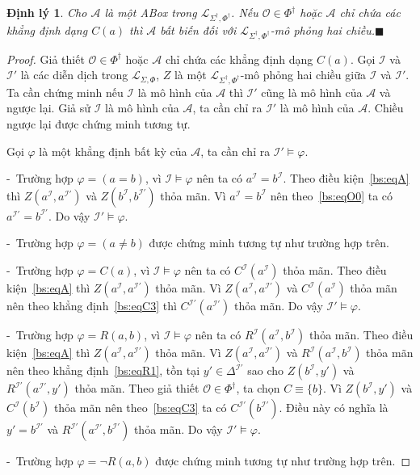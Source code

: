 \documentclass[12pt,a4paper,twoside]{report}
\newcommand{\mL}		{\mathcal{L}}
\newcommand{\mA}		{\mathcal{A}}
\newcommand{\mI}		{\mathcal{I}}
\newcommand{\mO}		{\mathcal{O}}
\newcommand{\PhiDag}	{\Phi^\dag}
\newcommand{\mLSP}		{\mL_{\Sigma,\Phi}}
\newcommand{\mLSPD}		{\mL_{\Sigma^\dag,\Phi^\dag}}
\newcommand{\semiItem}	{\mbox{- }}
\newcommand{\myend}		{\mbox{}\hfill\mbox{{\scriptsize$\!\blacksquare$}}}
\newtheorem{Theorem}{Định lý}[chapter]
\theoremstyle{definition}
\begin{document}
\begin{Theorem}
Cho $\mA$ là một ABox trong $\mLSPD$. Nếu $\mO \in \PhiDag$ hoặc $\mA$ chỉ chứa các khẳng định dạng $C(a)$ thì $\mA$ bất biến đối với $\mLSPD$-mô phỏng hai chiều.\myend
\end{Theorem}

\begin{proof}
Giả thiết $\mO \in \PhiDag$ hoặc $\mA$ chỉ chứa các khẳng định dạng $C(a)$. Gọi $\mI$ và $\mI'$ là các diễn dịch trong $\mLSP$, $Z$ là một $\mLSPD$-mô phỏng hai chiều giữa $\mI$ và $\mI'$. Ta cần chứng minh nếu $\mI$ là mô hình của $\mA$ thì $\mI'$ cũng là mô hình của $\mA$ và ngược lại. Giả sử $\mI$ là mô hình của $\mA$, ta cần chỉ ra $\mI'$ là mô hình của $\mA$. Chiều ngược lại được chứng minh tương tự.

Gọi $\varphi$ là một khẳng định bất kỳ của $\mA$, ta cần chỉ ra $\mI' \models \varphi$.

\semiItem Trường hợp $\varphi = (a=b)$, vì $\mI \models \varphi$ nên ta có $a^\mI = b^\mI$. Theo điều kiện~\eqref{bs:eqA} thì $Z(a^\mI, a^{\mI'})$ và $Z(b^\mI, b^{\mI'})$ thỏa mãn. Vì $a^\mI = b^\mI$ nên theo~\eqref{bs:eqO0} ta có $a^{\mI'} = b^{\mI'}$. Do vậy $\mI' \models \varphi$.

\semiItem Trường hợp $\varphi = (a\not=b)$ được chứng minh tương tự như trường hợp trên.

\semiItem Trường hợp $\varphi = C(a)$, vì $\mI \models \varphi$ nên ta có $C^\mI(a^\mI)$ thỏa mãn. Theo điều kiện~\eqref{bs:eqA} thì $Z(a^\mI, a^{\mI'})$ thỏa mãn. Vì $Z(a^\mI, a^{\mI'})$ và $C^\mI(a^\mI)$ thỏa mãn nên theo khẳng định~\eqref{bs:eqC3} thì $C^{\mI'}(a^{\mI'})$ thỏa mãn. Do vậy $\mI' \models \varphi$.

\semiItem Trường hợp $\varphi = R(a,b)$, vì $\mI \models \varphi$ nên ta có $R^\mI(a^\mI, b^\mI)$ thỏa mãn. Theo điều kiện~\eqref{bs:eqA} thì $Z(a^\mI, a^{\mI'})$ thỏa mãn. Vì $Z(a^\mI, a^{\mI'})$ và $R^{\mI}(a^\mI, b^\mI)$ thỏa mãn nên theo khẳng định~\eqref{bs:eqR1}, tồn tại $y' \in \Delta^{\mI'}$ sao cho $Z(b^\mI, y')$ và $R^{\mI'}(a^{\mI'}, y')$ thỏa mãn. Theo giả thiết $\mO \in \PhiDag$, ta chọn $C \equiv \{b\}$. Vì $Z(b^\mI, y')$ và $C^\mI(b^\mI)$ thỏa mãn nên theo~\eqref{bs:eqC3} ta có $C^{\mI'}(b^{\mI'})$. Điều này có nghĩa là $y' = b^{\mI'}$ và $R^{\mI'}(a^{\mI'},b^{\mI'})$ thỏa mãn. Do vậy $\mI' \models \varphi$.

\semiItem Trường hợp $\varphi = \neg R(a,b)$ được chứng minh tương tự như trường hợp trên.
\end{proof}
\end{document}
